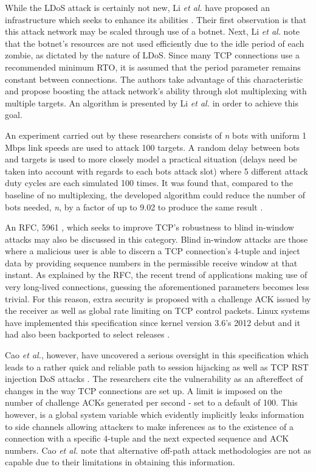 \documentclass[conference]{IEEEtran}
\begin{document}
While the LDoS attack is certainly not new, Li \textit{et al.} have proposed an infrastructure which seeks to enhance its abilities \cite{Li:LAAEM}. Their first observation is that this attack network may be scaled through use of a botnet. Next, Li \textit{et al.} note that the botnet's resources are not used efficiently due to the idle period of each zombie, as dictated by the nature of LDoS. Since many TCP connections use a recommended minimum RTO, it is assumed that the period parameter remains constant between connections. The authors take advantage of this characteristic and propose boosting the attack network's ability through slot multiplexing with multiple targets. An algorithm is presented by Li \textit{et al.} in order to achieve this goal.

An experiment carried out by these researchers consists of \textit{n} bots with uniform 1 Mbps link speeds are used to attack 100 targets. A random delay between bots and targets is used to more closely model a practical situation (delays need be taken into account with regards to each bots attack slot) where 5 different attack duty cycles are each simulated 100 times. It was found that, compared to the baseline of no multiplexing, the developed algorithm could reduce the number of bots needed, \textit{n}, by a factor of up to 9.02 to produce the same result \cite{Li:LAAEM}.

An RFC, 5961 \cite{Dalal:blindInWindow}, which seeks to improve TCP's robustness to blind in-window attacks may also be discussed in this category. Blind in-window attacks are those where a malicious user is able to discern a TCP connection's 4-tuple and inject data by providing sequence numbers in the permissible receive window at that instant. As explained by the RFC, the recent trend of applications making use of very long-lived connections, guessing the aforementioned parameters becomes less trivial. For this reason, extra security is proposed with a challenge ACK issued by the receiver as well as global rate limiting on TCP control packets. Linux systems have implemented this specification since kernel version 3.6's 2012 debut and it had also been backported to select releases \cite{OffPath:Cao}.

Cao \textit{et al.}, however, have uncovered a serious oversight in this specification which leads to a rather quick and reliable path to session hijacking as well as TCP RST injection DoS attacks \cite{OffPath:Cao}. The researchers cite the vulnerability as an aftereffect of changes in the way TCP connections are set up. A limit is imposed on the number of challenge ACKs generated per second - set to a default of 100. This however, is a global system variable which evidently implicitly leaks information to side channels allowing attackers to make inferences as to the existence of a connection with a specific 4-tuple and the next expected sequence and ACK numbers. Cao \textit{et al.} note that alternative off-path attack methodologies are not as capable due to their limitations in obtaining this information.
\end{document}
